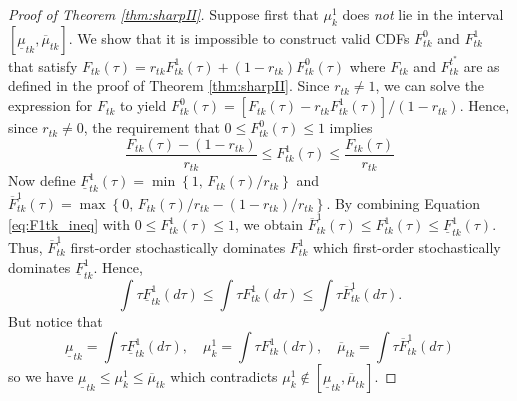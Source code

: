 \begin{proof}[Proof of Theorem \ref{thm:sharpII}]
Suppose first that $\mu^1_{k}$ does \emph{not} lie in the interval $[\underline{\mu}_{tk}, \overline{\mu}_{tk}]$.
We show that it is impossible to construct valid CDFs $F^0_{tk}$ and $F^{1}_{tk}$ that satisfy $F_{tk}(\tau) = r_{tk} F^1_{tk}(\tau) + (1 - r_{tk}) F^0_{tk}(\tau)$ where $F_{tk}$ and $F^{t^*}_{tk}$ are as defined in the proof of Theorem \ref{thm:sharpII}.
Since $r_{tk} \neq 1$, we can solve the expression for $F_{tk}$ to yield 
  $F^{0}_{tk}(\tau) = \left[ F_{tk}(\tau) - r_{tk} F^1_{tk}(\tau)\right] / (1 - r_{tk})$.
  Hence, since $r_{tk} \neq 0$, the requirement that $0 \leq F_{tk}^0(\tau) \leq 1$ implies
\begin{equation}
  \frac{F_{tk}(\tau) - (1 - r_{tk})}{r_{tk}} \leq F^{1}_{tk}(\tau) \leq \frac{F_{tk}(\tau)}{r_{tk}}
  \label{eq:F1tk_ineq}
\end{equation}
Now define $\underline{F}^{1}_{tk}(\tau) =  \min\left\{ 1,\,  F_{tk}(\tau)/r_{tk} \right\}$ and 
$\overline{F}^{1}_{tk}(\tau) = \max\left\{ 0,\,  F_{tk}(\tau)/r_{tk} - (1 - r_{tk})/r_{tk} \right\}$.
By combining Equation \ref{eq:F1tk_ineq} with $0 \leq F^{1}_{tk}(\tau) \leq 1$, we obtain $\overline{F}_{tk}^1(\tau) \leq F^{1}_{tk}(\tau) \leq \underline{F}_{tk}^1(\tau)$.
Thus, $\overline{F}^1_{tk}$ first-order stochastically dominates $F^{1}_{tk}$ which first-order stochastically dominates $\underline{F}_{tk}^1$. 
Hence,
\[
 \int \tau \underline{F}_{tk}^1(d\tau) \leq \int \tau F^{1}_{tk}(d\tau) \leq \int \tau\overline{F}_{tk}^1(d\tau).
\]
But notice that 
\[
  \underline{\mu}_{tk} = \int \tau \underline{F}_{tk}^1(d\tau), \quad 
  \mu^1_{k} = \int \tau F^{1}_{tk}(d\tau), \quad 
  \overline{\mu}_{tk} = \int \tau\overline{F}_{tk}^1(d\tau)
\]
so we have $\underline{\mu}_{tk} \leq \mu^1_{k} \leq \overline{\mu}_{tk}$ which contradicts $\mu^1_{k} \notin [\underline{\mu}_{tk}, \overline{\mu}_{tk}]$.


\end{proof}
